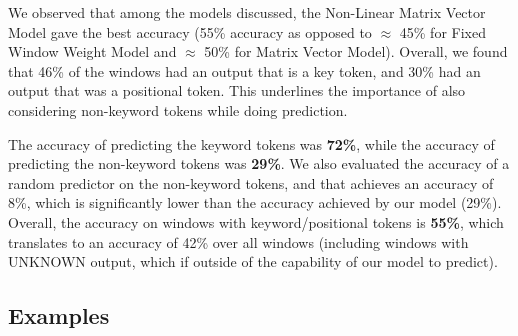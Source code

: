 We observed that among the models discussed, the Non-Linear Matrix Vector Model
gave the best accuracy (55\% accuracy as opposed to $\approx$ 45\% for Fixed
Window Weight Model and $\approx$ 50\% for Matrix Vector Model). Overall, we
found that 46\% of the windows had an output that is a key token, and 30\% had
an output that was a positional token. This underlines the importance of also
considering non-keyword tokens while doing prediction.

The accuracy of predicting the keyword tokens was {\bf 72\%}, while the accuracy
of predicting the non-keyword tokens was {\bf 29\%}. We also evaluated the
accuracy of a random predictor on the non-keyword tokens, and that achieves an
accuracy of 8\%, which is significantly lower than the accuracy achieved by our
model (29\%). Overall, the accuracy on windows with keyword/positional tokens is
{\bf 55\%}, which translates to an accuracy of 42\% over all windows (including
windows with UNKNOWN output, which if outside of the capability of our model to
predict).

\subsection{Examples}
\label{sec:examples}

